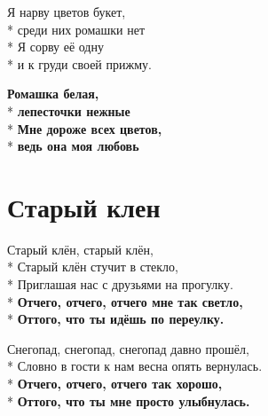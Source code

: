 \begin{minipage}{\linewidth}
Я нарву цветов букет,\\*
среди них ромашки нет\\*
Я сорву её одну\\*
и к груди своей прижму.\\
\end{minipage}\par\medskip\nobreak

\medskip

\begin{minipage}{\linewidth}
\hspace*{1.5em}\textbf{Ромашка белая,}\\*
\hspace*{1.5em}\textbf{лепесточки нежные}\\*
\hspace*{1.5em}\textbf{Мне дороже всех цветов,}\\*
\hspace*{1.5em}\textbf{ведь она моя любовь}\\
\end{minipage}

\vspace{\fill}\newpage

\section{Старый клен}
\label{song:Старый_клен}

\medskip

\begin{minipage}{\linewidth}
Старый клён, старый клён,\\*
Старый клён стучит в стекло,\\*
Приглашая нас с друзьями на прогулку.\\*
\textbf{Отчего, отчего, отчего мне так светло,}\\*
\textbf{Оттого, что ты идёшь по переулку.}\\
\end{minipage}\par\medskip\nobreak

\medskip

\begin{minipage}{\linewidth}
Снегопад, снегопад, снегопад давно прошёл,\\*
Словно в гости к нам весна опять вернулась.\\*
\textbf{Отчего, отчего, отчего так хорошо,}\\*
\textbf{Оттого, что ты мне просто улыбнулась.}\\
\end{minipage}\par\medskip\nobreak


